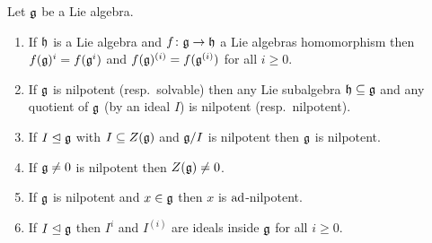 \begin{prop}\label{prop: properties of solvable and nilpotent}
 Let $\mathfrak{g}$ be a Lie algebra.
 \begin{enumerate}[leftmargin=*]
  \item
   If $\mathfrak{h}$ is a Lie algebra and $f \colon \mathfrak{g} \to \mathfrak{h}$ a Lie algebras homomorphism then $f(\mathfrak{g})^i = f(\mathfrak{g}^i)$ and $f(\mathfrak{g})^{(i)} = f(\mathfrak{g}^{(i)})$ for all $i \geq 0$.
  \item
   If $\mathfrak{g}$ is nilpotent (resp.\ solvable) then any Lie subalgebra $\mathfrak{h} \subseteq \mathfrak{g}$ and any quotient of $\mathfrak{g}$ (by an ideal $I$) is nilpotent (resp.\ nilpotent).
  \item
   If $I \trianglelefteq \mathfrak{g}$ with $I \subseteq Z(\mathfrak{g})$ and $\mathfrak{g}/I$ is nilpotent then $\mathfrak{g}$ is nilpotent.
  \item
   If $\mathfrak{g} \neq 0$ is nilpotent then $Z(\mathfrak{g}) \neq 0$.
  \item
   If $\mathfrak{g}$ is nilpotent and $x \in \mathfrak{g}$ then $x$ is $\operatorname{ad}$-nilpotent.
  \item
   If $I \trianglelefteq \mathfrak{g}$ then $I^i$ and $I^{(i)}$ are ideals inside $\mathfrak{g}$ for all $i \geq 0$.
 \end{enumerate}
\end{prop}
